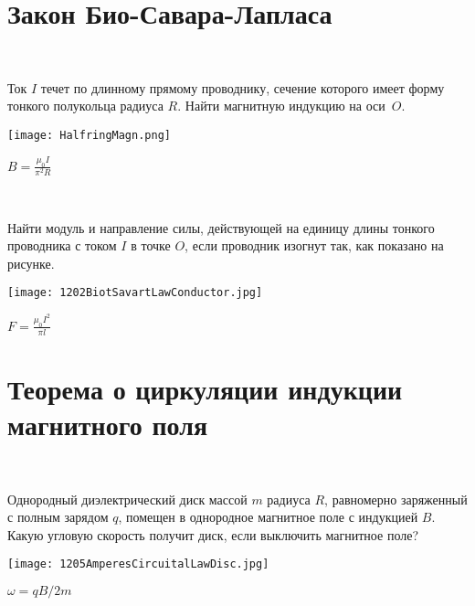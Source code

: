 \section{Закон Био-Савара-Лапласа}

\begin{ex}
\hspace{0pt} \\
\begin{minipage}{.65\textwidth}
Ток $I$ течет по длинному прямому проводнику, сечение которого имеет форму тонкого полукольца радиуса $R$. Найти магнитную индукцию на оси~$O$.
\end{minipage}
\begin{minipage}{.35\textwidth}
\centering
\texttt{[image: HalfringMagn.png]}
\end{minipage}
\begin{ans}
$B = \frac{\mu_0 I}{\pi^2 R}$
\end{ans}
\end{ex}

\begin{ex}
\hspace{0pt} \\
\begin{minipage}{.65\textwidth}
Найти модуль и направление силы, действующей на единицу длины тонкого проводника с током $I$ в точке $O$, если проводник изогнут так, как показано на рисунке.
\end{minipage}
\begin{minipage}{.35\textwidth}
\centering
\texttt{[image: 1202BiotSavartLawConductor.jpg]}
\end{minipage}
\begin{ans}
$F = \frac{\mu_0 I^2}{\pi l}$
\end{ans}
\end{ex}

\section{Теорема о циркуляции индукции магнитного поля}

\begin{ex}
\hspace{0pt} \\
\begin{minipage}{.65\textwidth}
Однородный диэлектрический диск массой $m$ радиуса $R$, равномерно заряженный с полным зарядом $q$, помещен в однородное магнитное поле с индукцией $B$. Какую угловую скорость получит диск, если выключить магнитное поле?
\end{minipage}
\begin{minipage}{.35\textwidth}
\centering
\texttt{[image: 1205AmperesCircuitalLawDisc.jpg]}
\end{minipage}
\begin{ans}
$\omega = qB/2m$
\end{ans}
\end{ex}

